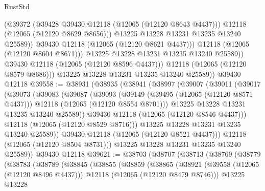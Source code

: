 \begin{lexlean}{RustStd}
\begin{coremodule}
                        (@39372
                          (@39428 @39430 @12118 (@12065 (@12120 @8643 @4437)))
                          @12118
                          (@12065 (@12120 @8629 @8656)))
                        @13225
                        @13228
                        @13231
                        @13235
                        @13240
                        @25589))
                    @39430
                    @12118
                    (@12065 (@12120 @8621 @4437)))
                  @12118
                  (@12065 (@12120 @8604 @8671)))
                @13225
                @13228
                @13231
                @13235
                @13240
                @25589))
            @39430
            @12118
            (@12065 (@12120 @8596 @4437)))
          @12118
          (@12065 (@12120 @8579 @8686)))
        @13225
        @13228
        @13231
        @13235
        @13240
        @25589))
    @39430
    @12118
@39558 := @38931
    (@38935
      (@38941
        (@38997
          (@39007
            (@39011
              (@39017
                (@39073
                  (@39083
                    (@39087
                      (@39093
                        (@39149
                          (@39495 (@12065 (@12120 @8571 @4437)))
                          @12118
                          (@12065 (@12120 @8554 @8701)))
                        @13225
                        @13228
                        @13231
                        @13235
                        @13240
                        @25589))
                    @39430
                    @12118
                    (@12065 (@12120 @8546 @4437)))
                  @12118
                  (@12065 (@12120 @8529 @8716)))
                @13225
                @13228
                @13231
                @13235
                @13240
                @25589))
            @39430
            @12118
            (@12065 (@12120 @8521 @4437)))
          @12118
          (@12065 (@12120 @8504 @8731)))
        @13225
        @13228
        @13231
        @13235
        @13240
        @25589))
    @39430
    @12118
@39621 := @38703
    (@38707
      (@38713
        (@38769
          (@38779
            (@38783
              (@38789
                (@38845
                  (@38855
                    (@38859
                      (@38865
                        (@38921
                          (@39558 (@12065 (@12120 @8496 @4437)))
                          @12118
                          (@12065 (@12120 @8479 @8746)))
                        @13225
                        @13228

\end{coremodule}
\end{lexlean}
